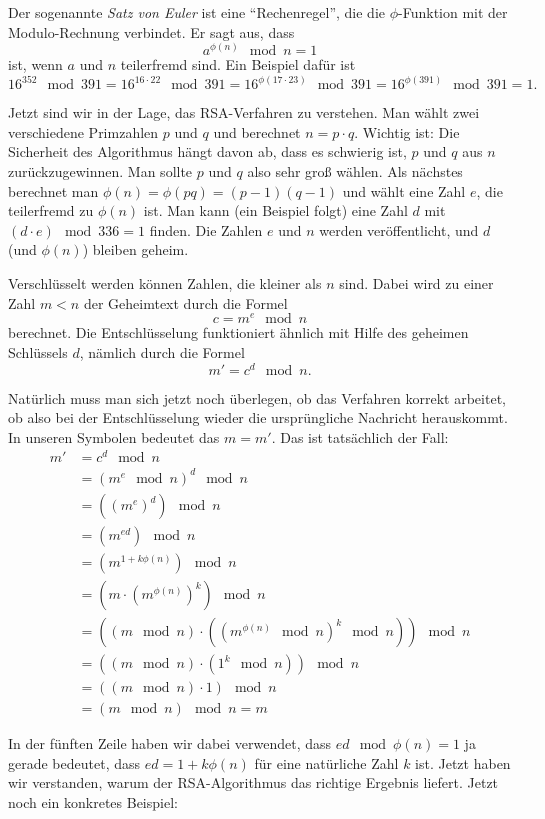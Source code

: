 \documentclass{zusammenfassung}
\begin{document}
Der sogenannte \emph{Satz von Euler} ist eine "`Rechenregel"', die die $\phi$-Funktion mit der Modulo-Rechnung verbindet. Er sagt
aus, dass
\[
	a^{\phi(n)}\mod n=1
\]
ist, wenn $a$ und $n$ teilerfremd sind. Ein Beispiel dafür ist 
\[
	16^{352}\mod 391=16^{16\cdot 22}\mod 391=16^{\phi(17\cdot 23)}\mod 391=16^{\phi(391)}\mod 391=1.
\]

Jetzt sind wir in der Lage, das RSA-Verfahren zu verstehen. Man wählt zwei verschiedene Primzahlen $p$ und $q$ und berechnet
$n=p\cdot q$. Wichtig ist: Die Sicherheit des Algorithmus hängt davon ab, dass es schwierig ist, $p$ und $q$ aus $n$
zurückzugewinnen. Man sollte $p$ und $q$ also sehr groß wählen. Als nächstes berechnet man $\phi(n)=\phi(pq)=(p-1)(q-1)$ und wählt
eine Zahl $e$, die teilerfremd zu $\phi(n)$ ist. Man kann (ein Beispiel folgt) eine Zahl $d$ mit $(d\cdot e)\mod 336=1$ finden.
Die Zahlen $e$ und $n$ werden veröffentlicht, und $d$ (und $\phi(n)$) bleiben geheim.

Verschlüsselt werden können Zahlen, die kleiner als $n$ sind. Dabei wird zu einer Zahl $m<n$ der Geheimtext durch die Formel
\[
	c=m^e\mod n
\]
berechnet. Die Entschlüsselung funktioniert ähnlich mit Hilfe des geheimen Schlüssels $d$, nämlich durch die Formel
\[
	m'=c^d\mod n.
\]

Natürlich muss man sich jetzt noch überlegen, ob das Verfahren korrekt arbeitet, ob also bei der Entschlüsselung wieder die
ursprüngliche Nachricht herauskommt. In unseren Symbolen bedeutet das $m=m'$. Das ist tatsächlich der Fall:
\begin{align*}
	m'&=c^d\mod n\\
	&=(m^e\mod n)^d\mod n\\
	&=((m^e)^d)\mod n\\
	&=(m^{ed})\mod n\\
	&=(m^{1+k\phi(n)})\mod n\\
	&=(m\cdot (m^{\phi(n)})^k)\mod n\\
	&=((m\mod n)\cdot ((m^{\phi(n)}\mod n)^k\mod n))\mod n\\
	&=((m\mod n)\cdot (1^k\mod n))\mod n\\
	&=((m\mod n)\cdot 1)\mod n\\
	&=(m\mod n)\mod n=m
\end{align*}

In der fünften Zeile haben wir dabei verwendet, dass $ed\mod\phi(n)=1$ ja gerade bedeutet, dass $ed=1+k\phi(n)$ für eine
natürliche Zahl $k$ ist. Jetzt haben wir verstanden, warum der RSA-Algorithmus das richtige Ergebnis liefert. Jetzt noch ein
konkretes Beispiel:
\end{document}
